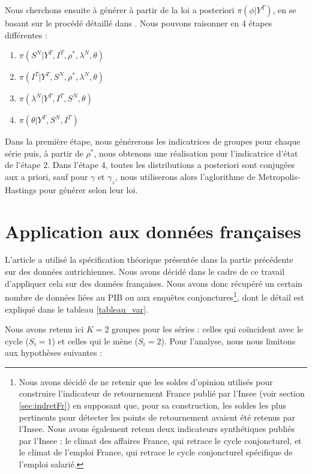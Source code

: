 \documentclass[10pt,french,french]{article}
\let\rmarkdownfootnote\footnote%
\def\footnote{\protect\rmarkdownfootnote}
\begin{document}
Nous cherchons ensuite à générer à partir de la loi a posteriori \(\pi(\phi|Y^T)\), en se basant sur le procédé détaillé dans \cite{FruhwirthKaufmann}.
Nous pouvons raisonner en 4 étapes différentes :

\begin{enumerate}
\def\labelenumi{\arabic{enumi}.}
\item
  \(\pi(S^N|Y^T, I^T, \rho^*, \lambda^N, \theta)\)
\item
  \(\pi(I^T|Y^T, S^N, \rho^*, \lambda^N, \theta)\)
\item
  \(\pi(\lambda^N|Y^T, I^T, S^N, \theta)\)
\item
  \(\pi(\theta|Y^T,S^N,I^T)\)
\end{enumerate}

Dans la première étape, nous générerons les indicatrices de groupes pour chaque série puis, à partir de \(\rho^*\), nous obtenons une réalisation pour l'indicatrice d'état de l'étape 2.
Dans l'étape 4, toutes les distributions a posteriori sont conjugées aux a priori, sauf pour \(\gamma\) et \(\gamma_z\), nous utiliserons alors l'aglorithme de Metropolis-Hastings pour générer selon leur loi.

\hypertarget{application-aux-donnuxe9es-franuxe7aises}{%
\section{Application aux données françaises}\label{application-aux-donnuxe9es-franuxe7aises}}

L'article \cite{Kaufmann} a utilisé la spécification théorique présentée dans la partie précédente sur des données autrichiennes.
Nous avons décidé dans le cadre de ce travail d'appliquer cela sur des données françaises.
Nous avons donc récupéré un certain nombre de données liées au PIB ou aux enquêtes conjonctures\footnote{Nous avons décidé de ne retenir que les soldes d'opinion utilisés pour construire l'indicateur de retournement France publié par l'Insee (voir section \ref{sec:indretFr}) en supposant que, pour sa construction, les soldes les plus pertinents pour détecter les points de retournement avaient été retenus par l'Insee.
  Nous avons également retenu deux indicateurs synthétiques publiés par l'Insee : le climat des affaires France, qui retrace le cycle conjoncturel, et le climat de l'emploi France, qui retrace le cycle conjoncturel spécifique de l'emploi salarié.}, dont le détail est expliqué dans le tableau \ref{tableau_var}.

Nous avons retenu ici \(K=2\) groupes pour les séries : celles qui coïncident avec le cycle (\(S_i = 1\)) et celles qui le mène (\(S_i = 2\)).
Pour l'analyse, nous nous limitons aux hypothèses suivantes :
\end{document}
